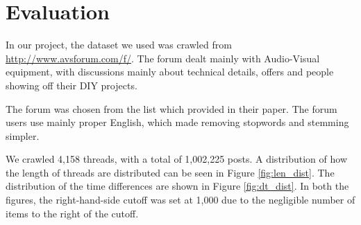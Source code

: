\chapter{Evaluation}

In our project, the dataset we used was crawled from 
\url{http://www.avsforum.com/f/}. The forum dealt mainly with Audio-Visual 
equipment, with discussions mainly about technical details, offers and people 
showing off their DIY projects.

The forum was chosen from the list which  provided in their 
paper. The forum users use mainly proper English, which made removing stopwords 
and stemming simpler.

We crawled 4,158 threads, with a total of 1,002,225 posts. A distribution of how 
the length of threads are distributed can be seen in Figure \ref{fig:len_dist}.  
The distribution of the time differences are shown in Figure \ref{fig:dt_dist}.  
In both the figures, the right-hand-side cutoff was set at 1,000 due to the 
negligible number of items to the right of the cutoff.



